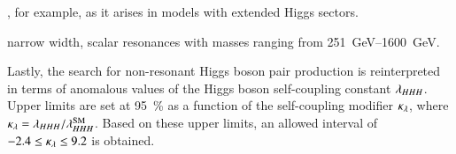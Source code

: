 
, for example, as it arises in models with extended Higgs sectors.

narrow width, scalar resonances with masses ranging from
\SIrange{251}{1600}{\GeV}.



Lastly, the search for non-resonant Higgs boson pair production is reinterpreted
in terms of anomalous values of the Higgs boson self-coupling constant
$\lambda_{HHH}$. Upper limits are set at \SI{95}{\percent} as a function of the
self-coupling modifier $\kappa_{\lambda}$, where
$\kappa_{\lambda} = \lambda_{HHH} / \lambda_{HHH}^{\text{SM}}$. Based on these upper limits,
an allowed \klambda interval of $\num{-2.4} \leq \kappa_{\lambda} \leq 9.2$ is obtained.



%


%


